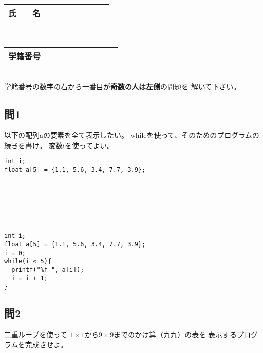 \documentclass[a4j]{jarticle}
\def\ds{\displaystyle}
\begin{document}
\thispagestyle{empty}

\begin{multicols*}{2}%


\def\subst#1#2{$\ds #1$
 \ $\longrightarrow$\ 
 \underline{\hbox to 5cm{\ttfamily #2}}}



\noindent
\begin{tabular}[t]{|c|cccccccc|}\hline
氏　　名 & & & & & & & & \\ \hline
\end{tabular}\\
\begin{tabular}[t]{|c|c|c|c|c|c|c|c|c|c|}\hline
学籍番号 & & & & & & & & \\ \hline
\end{tabular}\\
学籍番号の\underline{数字の}右から一番目が{\bfseries 奇数の人は左側}の問題を
解いて下さい。
\vspace{-5ex}






\subsection*{問1}

以下の配列{\ttfamily a}の要素を全て表示したい。
{\ttfamily while}を使って、そのためのプログラムの続きを書け。
変数{\ttfamily i}を使ってよい。


\ifnum {}
\begin{verbatim}
int i;
float a[5] = {1.1, 5.6, 3.4, 7.7, 3.9};







\end{verbatim}
\else
\begin{verbatim}
int i;
float a[5] = {1.1, 5.6, 3.4, 7.7, 3.9};
i = 0;
while(i < 5){
  printf("%f ", a[i]);
  i = i + 1;
}
\end{verbatim}
\fi
\vspace{5cm}



\subsection*{問2}

二重ループを使って
$1\times1$から$9\times9$までのかけ算（九九）の表を
表示するプログラムを完成させよ。



\end{multicols*}
\end{document}
